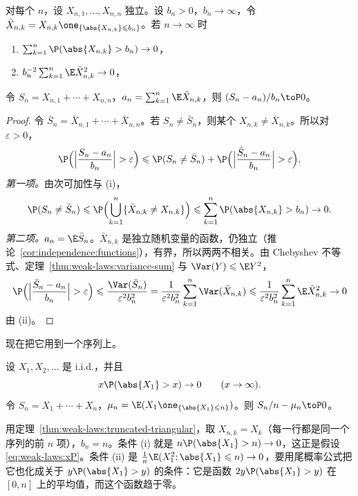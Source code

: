 \begin{theorem}[三角阵列的弱大数定律]\label{thm:weak-laws:truncated-triangular}
对每个 $n$，设 $X_{n,1},\dots,X_{n,n}$ 独立。设 $b_n>0$，$b_n\to\infty$，令 $\bar X_{n,k}=X_{n,k}\one_{\{\abs{X_{n,k}}\leqslant b_n\}}$。若 $n\to\infty$ 时
\begin{enumerate}
\item[(i)] $\sum_{k=1}^n\P(\abs{X_{n,k}}>b_n)\to0$，
\item[(ii)] $b_n^{-2}\sum_{k=1}^n\E\bar X_{n,k}^2\to0$，
\end{enumerate}
令 $S_n=X_{n,1}+\cdots+X_{n,n}$，$a_n=\sum_{k=1}^n\E\bar X_{n,k}$，则 $(S_n-a_n)/b_n\toP0$。
\end{theorem}
\begin{proof}
令 $\bar S_n=\bar X_{n,1}+\cdots+\bar X_{n,n}$。若 $S_n\neq\bar S_n$，则某个 $X_{n,k}\neq\bar X_{n,k}$。所以对 $\varepsilon>0$，
\[
\P\Bigl(\Bigl\lvert\frac{S_n-a_n}{b_n}\Bigr\rvert>\varepsilon\Bigr)\leqslant \P(S_n\neq\bar S_n)+\P\Bigl(\Bigl\lvert\frac{\bar S_n-a_n}{b_n}\Bigr\rvert>\varepsilon\Bigr).
\]
\emph{第一项。}由次可加性与 (i)，
\[
\P(S_n\neq\bar S_n)\leqslant \P\Bigl(\bigcup_{k=1}^n\{\bar X_{n,k}\neq X_{n,k}\}\Bigr)\leqslant\sum_{k=1}^n\P(\abs{X_{n,k}}>b_n)\to0 .
\]
\emph{第二项。}$a_n=\E\bar S_n$。$\bar X_{n,k}$ 是独立随机变量的函数，仍独立（推论~\ref{cor:independence:functions}），有界，所以两两不相关。由 Chebyshev 不等式、定理~\ref{thm:weak-laws:variance-sum} 与 $\Var(Y)\leqslant \E Y^2$，
\[
\P\Bigl(\Bigl\lvert\frac{\bar S_n-a_n}{b_n}\Bigr\rvert>\varepsilon\Bigr)\leqslant\frac{\Var(\bar S_n)}{\varepsilon^2b_n^2}=\frac1{\varepsilon^2b_n^2}\sum_{k=1}^n\Var(\bar X_{n,k})\leqslant\frac1{\varepsilon^2b_n^2}\sum_{k=1}^n\E\bar X_{n,k}^2\to0
\]
由 (ii)。
\end{proof}

现在把它用到一个序列上。

\begin{theorem}[弱大数定律]\label{thm:weak-laws:wlln}
设 $X_1,X_2,\dots$ 是 i.i.d.，并且
\begin{equation}\label{eq:weak-laws:xP}
x\P(\abs{X_1}>x)\to0\qquad(x\to\infty).
\end{equation}
令 $S_n=X_1+\cdots+X_n$，$\mu_n=\E(X_1\one_{\{\abs{X_1}\leqslant n\}})$。则 $S_n/n-\mu_n\toP0$。
\end{theorem}

\begin{remark}[证明思路]
用定理~\ref{thm:weak-laws:truncated-triangular}，取 $X_{n,k}=X_k$（每一行都是同一个序列的前 $n$ 项），$b_n=n$。条件 (i) 就是 $n\P(\abs{X_1}>n)\to0$，这正是假设 \eqref{eq:weak-laws:xP}。条件 (ii) 是 $\frac1n\E(X_1^2;\abs{X_1}\leqslant n)\to0$，要用尾概率公式把它也化成关于 $y\P(\abs{X_1}>y)$ 的条件：它是函数 $2y\P(\abs{X_1}>y)$ 在 $[0,n]$ 上的平均值，而这个函数趋于零。
\end{remark}

